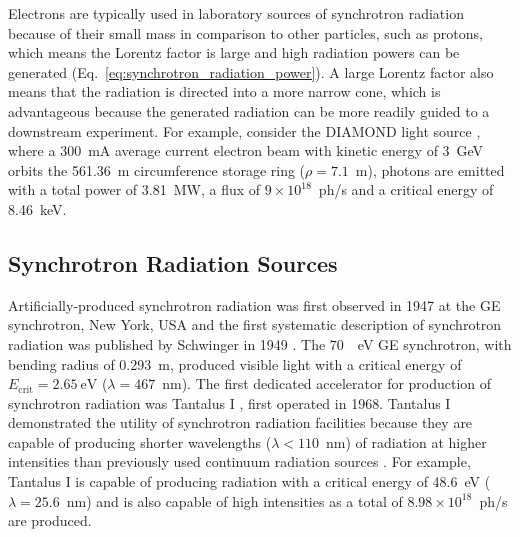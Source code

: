 \documentclass[../main.tex]{subfiles}
\begin{document}
Electrons are typically used in laboratory sources of synchrotron radiation because of their small mass in comparison to other particles, such as protons, which means the Lorentz factor is large and high radiation powers can be generated (Eq.~\ref{eq:synchrotron_radiation_power}). A large Lorentz factor also means that the radiation is directed into a more narrow cone, which is advantageous because the generated radiation can be more readily guided to a downstream experiment. For example, consider the DIAMOND light source \cite{materlik2015diamond}, where a 300~\si{\milli\ampere} average current electron beam with kinetic energy of 3~\si{\giga\electronvolt} orbits the 561.36~\si{\meter} circumference storage ring ($\rho = 7.1$~\si{\meter}), photons are emitted with a total power of 3.81~\si{\mega\watt}, a flux of $9\times 10^{18}$~ph/\si{\second} and a critical energy of 8.46~\si{\kilo\electronvolt}.   

\subsection{Synchrotron Radiation Sources}

Artificially-produced synchrotron radiation was first observed in 1947 at the GE synchrotron, New York, USA \cite{elder1948radiation} and the first systematic description of synchrotron radiation was published by Schwinger in 1949 \cite{schwinger1949classical}. The 70~\si{\meg\electronvolt} GE synchrotron, with bending radius of 0.293~\si{\meter}, produced visible light with a critical energy of $E_{\mathrm{crit}} = 2.65~\si{\electronvolt}$ ($\lambda = 467$~\si{\nano\meter}). The first dedicated accelerator for production of synchrotron radiation was Tantalus I \cite{rowe1973tantalus}, first operated in 1968. Tantalus I demonstrated the utility of synchrotron radiation facilities because they are capable of producing shorter wavelengths ($\lambda < 110$~\si{\nano\meter}) of radiation at higher intensities than previously used continuum radiation sources \cite{rowe1973tantalus}. For example, Tantalus I is capable of producing radiation with a critical energy of 48.6~\si{\electronvolt} ($\lambda = 25.6$~\si{\nano\meter}) and is also capable of high intensities as a total of $8.98\times 10^{18}$~ph/\si{\second} are produced.  
\end{document}
